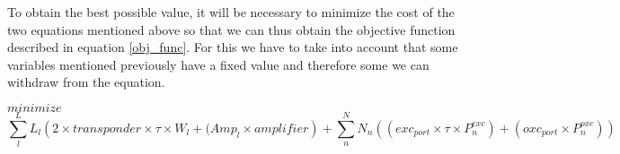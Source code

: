 To obtain the best possible value, it will be necessary to minimize the cost of the two equations mentioned above so that we can thus obtain the objective function described in equation \ref{obj_func}. For this we have to take into account that some variables mentioned previously have a fixed value and therefore some we can withdraw from the equation.

$minimize$
\begin{equation}
\sum_{l}^L L_{l} \left(2 \times transponder \times \tau \times W_{l} + ( Amp_{l} \times amplifier \right) + \sum_{n}^N N_{n} ( \left(exc_{port} \times \tau \times P^{exc}_{n} \right) + \left(oxc_{port} \times P^{oxc}_{n} \right) )
\label{obj_func}
\end{equation}


